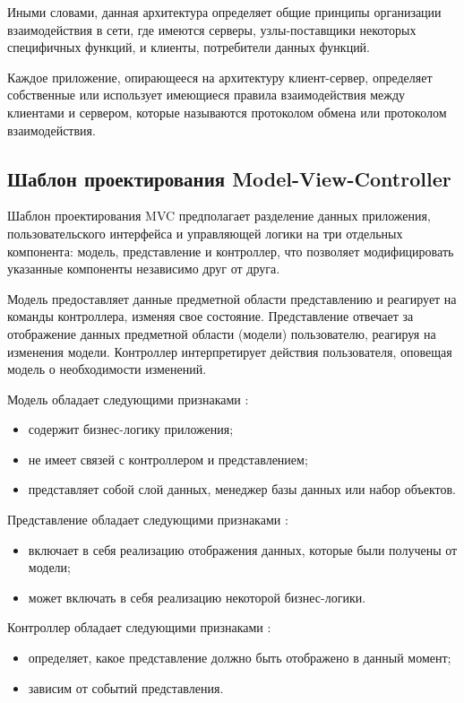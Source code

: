 Иными словами, данная архитектура определяет общие принципы организации взаимодействия в сети, где имеются серверы, узлы-поставщики некоторых специфичных функций, и клиенты, потребители данных функций.

Каждое приложение, опирающееся на архитектуру клиент-сервер, определяет собственные или использует имеющиеся правила взаимодействия между клиентами и сервером, которые называются протоколом обмена или протоколом взаимодействия. \cite{clientServerProt}

\subsection{Шаблон проектирования Model-View-Controller}
Шаблон проектирования MVC предполагает разделение данных приложения, пользовательского интерфейса и управляющей логики на три отдельных компонента: модель, представление и контроллер, что позволяет модифицировать указанные компоненты независимо друг от друга. \cite{mvcInfo}

Модель предоставляет данные предметной области представлению и реагирует на команды контроллера, изменяя свое состояние. Представление отвечает за отображение данных предметной области (модели) пользователю, реагируя на изменения модели. Контроллер интерпретирует действия пользователя, оповещая модель о необходимости изменений. \cite{mvcInfo}

Модель обладает следующими признаками \cite{mvcHabr}:
\begin{itemize}[leftmargin=1.6\parindent]
\item содержит бизнес-логику приложения;
\item не имеет связей с контроллером и представлением;
\item представляет собой слой данных, менеджер базы данных или набор объектов.
\end{itemize}

Представление обладает следующими признаками \cite{mvcHabr}:
\begin{itemize}[leftmargin=1.6\parindent]
\item включает в себя реализацию отображения данных, которые были получены от модели;
\item может включать в себя реализацию некоторой бизнес-логики.
\end{itemize}

Контроллер обладает следующими признаками \cite{mvcHabr}:
\begin{itemize}[leftmargin=1.6\parindent]
\item определяет, какое представление должно быть отображено в данный момент;
\item зависим от событий представления.
\end{itemize}

